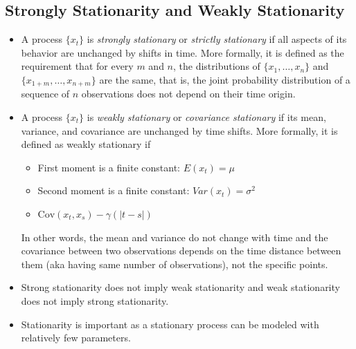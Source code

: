 \documentclass[11pt]{article}
\begin{document}
\subsection{Strongly Stationarity and Weakly Stationarity}
\begin{itemize}
    \item A process $\{x_t\}$ is \textit{strongly stationary} or \textit{strictly stationary}
    if all aspects of its behavior are unchanged by shifts in time. More formally, it is
    defined as the requirement that for every $m$ and $n$, the distributions of $\{x_1, \ldots,
    x_n\}$ and $\{x_{1+m}, \ldots, x_{n+m}\}$ are the same, that is, the joint probability 
    distribution of a sequence of $n$ observations does not depend on their time origin.
   \item A process $\{x_t\}$ is \textit{weakly stationary} or \textit{covariance stationary} if 
   its mean, variance, and covariance are unchanged by time shifts. More formally, it is 
   defined as weakly stationary if 
   \begin{itemize}
    \item First moment is a finite constant: $E(x_t) = \mu$
    \item Second moment is a finite constant: $Var(x_t) = \sigma^2$
    \item $\text{Cov}(x_t, x_s) - \gamma(|t-s|)$
   \end{itemize}
   In other words, the mean and variance do not change with time and the covariance between 
   two observations depends on the time distance between them (aka having same number of 
   observations), not the specific points. 
   \item Strong stationarity does not imply weak stationarity and weak stationarity does not 
   imply strong stationarity.    
   \item Stationarity is important as a stationary process can be modeled with relatively few 
   parameters.
\end{itemize}
\end{document}
